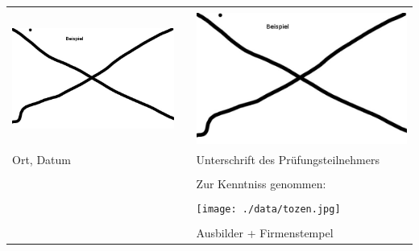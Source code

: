 \begin{tabular}{lp{2em}l} 
\hspace{5cm}   && \hspace{4cm} \\
\includegraphics[scale=0.9]{./data/date.jpg}  &&  \includegraphics[scale=0.9]{./data/unterschrift.jpg} \\
\cline{1-1}\cline{3-3} 
Ort, Datum     && Unterschrift des Pr\"ufungsteilnehmers\\
&& \vspace{1cm} \\
&& Zur Kenntniss genommen:\\
\vspace{1cm} && \\
&& \texttt{[image: ./data/tozen.jpg]} \\
&& \hspace{4cm}\\\cline{3-3}
&& Ausbilder + Firmenstempel
\end{tabular}